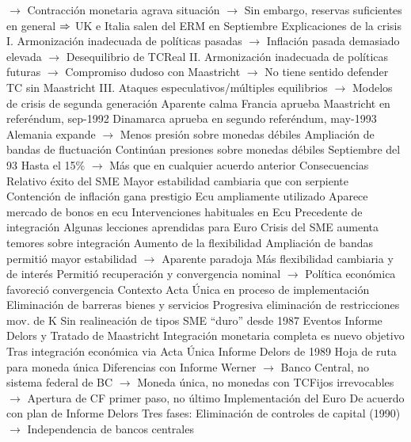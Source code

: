 \documentclass{nuevotema}
\begin{document}
\begin{esquemal}
				\4[] $\to$ Contracción monetaria agrava situación
				\4[] $\to$ Sin embargo, reservas suficientes en general
				\4[] $\Rightarrow$ UK e Italia salen del ERM en Septiembre
				\4 Explicaciones de la crisis
				\4[] I. Armonización inadecuada de políticas pasadas
				\4[] $\to$ Inflación pasada demasiado elevada
				\4[] $\to$ Desequilibrio de TCReal
				\4[] II. Armonización inadecuada de políticas futuras
				\4[] $\to$ Compromiso dudoso con Maastricht
				\4[] $\to$ No tiene sentido defender TC sin Maastricht
				\4[] III. Ataques especulativos/múltiples equilibrios
				\4[] $\to$ Modelos de crisis de segunda generación
				\4 Aparente calma
				\4[] Francia aprueba Maastricht en referéndum, sep-1992
				\4[] Dinamarca aprueba en segundo referéndum, may-1993
				\4[] Alemania expande
				\4[] $\to$ Menos presión sobre monedas débiles
				\4 Ampliación de bandas de fluctuación
				\4[] Continúan presiones sobre monedas débiles
				\4[] Septiembre del 93
				\4[] Hasta el 15\%
				\4[] $\to$ Más que en cualquier acuerdo anterior
		\2 Consecuencias
			\3 Relativo éxito del SME
				\4 Mayor estabilidad cambiaria que con serpiente
				\4 Contención de inflación gana prestigio
				\4 Ecu ampliamente utilizado
				\4[] Aparece mercado de bonos en ecu
				\4[] Intervenciones habituales en Ecu
			\3 Precedente de integración
				\4 Algunas lecciones aprendidas para Euro
				\4 Crisis del SME aumenta temores sobre integración
			\3 Aumento de la flexibilidad
				\4 Ampliación de bandas permitió mayor estabilidad
				\4[] $\to$ Aparente paradoja
				\4 Más flexibilidad cambiaria y de interés
				\4[] Permitió recuperación y convergencia nominal
				\4[] $\to$ Política económica favoreció convergencia
	\1 
		\2 Contexto
			\3 Acta Única en proceso de implementación
				\4 Eliminación de barreras bienes y servicios
				\4 Progresiva eliminación de restricciones mov. de K
			\3 Sin realineación de tipos
				\4 SME ``duro'' desde 1987
		\2 Eventos
			\3 Informe Delors y Tratado de Maastricht
				\4 Integración monetaria completa es nuevo objetivo
				\4[] Tras integración económica via Acta Única
				\4 Informe Delors de 1989
				\4[] Hoja de ruta para moneda única
				\4 Diferencias con Informe Werner
				\4[] $\to$ Banco Central, no sistema federal de BC
				\4[] $\to$ Moneda única, no monedas con TCFijos irrevocables
				\4[] $\to$ Apertura de CF primer paso, no último
			\3 Implementación del Euro
				\4 De acuerdo con plan de Informe Delors
				\4[] Tres fases:
				\4[I.] Eliminación de controles de capital (1990)
				\4[] $\to$ Independencia de bancos centrales

\end{esquemal}
\end{document}
